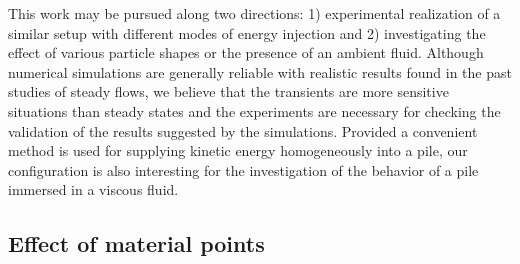 This work may be pursued along two directions: 1) experimental 
realization of a similar setup with different modes of energy injection and 
2) investigating the effect of various particle shapes or the presence of an 
ambient fluid. Although numerical simulations are generally reliable 
with realistic results found in the past studies of steady flows, we believe 
that the transients are more sensitive situations than steady states and the  
experiments are necessary for checking the validation of the results suggested 
by the simulations. Provided a convenient method is used for supplying kinetic 
energy homogeneously into a pile, our configuration is also interesting for 
the investigation of the behavior of a pile immersed in a viscous 
fluid.

\subsection{Effect of material points}

